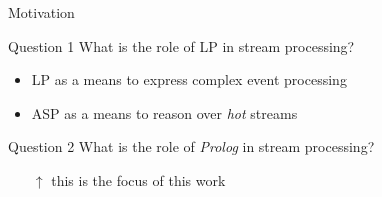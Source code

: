 \documentclass[presentation]{beamer}
\begin{document}

\begin{frame}[c]{Motivation}
    \begin{block}{Question 1}
        \centering
        What is the role of LP in stream processing?
    \end{block}
    \begin{itemize}
        \item LP as a means to express \alert{complex event processing} 
        \item \alert{ASP} as a means to reason over \emph{hot} streams 
    \end{itemize}

    \vfill

    \begin{block}{Question 2}
        \centering
        What is the role of \emph{Prolog} in stream processing?
    \end{block}
    \begin{itemize}
        \item[$\uparrow$] this is the focus of this work
    \end{itemize}
\end{frame}
\end{document}
